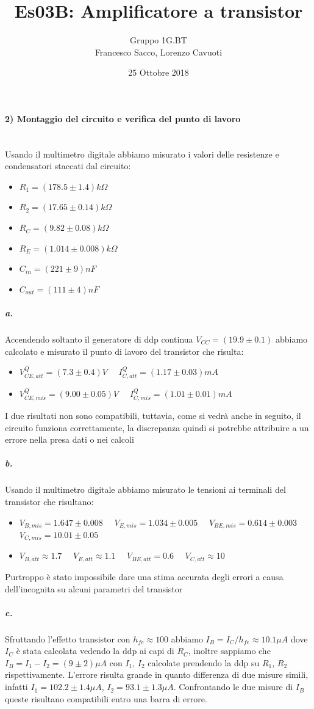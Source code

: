 \documentclass[10pt,a4paper]{article}
\author{Gruppo 1G.BT \\ Francesco Sacco, Lorenzo Cavuoti}
\title{Es03B: Amplificatore a transistor}
\date{25 Ottobre 2018}
\begin{document}
\maketitle
\paragraph{2) Montaggio del circuito e verifica del punto di lavoro}\mbox{}\\
Usando il multimetro digitale abbiamo misurato i valori delle resistenze e condensatori staccati dal circuito:
\begin{itemize}
\item[] $R_1=(178.5\pm1.4)k\Omega$ 
\item[] $R_2=(17.65\pm0.14)k\Omega$ 
\item[] $R_C=(9.82\pm0.08)k\Omega$ 
\item[] $R_E=(1.014\pm0.008)k\Omega$
\item[] $C_{in}=(221\pm9)nF$
\item[] $C_{out}=(111\pm4)nF$
\end{itemize}

\subparagraph{a.}
Accendendo soltanto il generatore di ddp continua $V_{CC}=(19.9\pm0.1)$ abbiamo calcolato e misurato il punto di lavoro del transistor che risulta:
\begin{itemize}
\item[] $V_{CE,att}^Q = (7.3\pm0.4)V \quad$ $I_{C,att}^Q = (1.17\pm0.03)mA \quad$
\item[] $V_{CE,mis}^Q = (9.00\pm0.05)V \quad$ $ I_{C,mis}^Q = (1.01\pm0.01)mA \quad$
\end{itemize}
I due risultati non sono compatibili, tuttavia, come si vedrà anche in seguito, il circuito funziona correttamente, la discrepanza quindi si potrebbe attribuire a un errore nella presa dati o nei calcoli

\subparagraph{b.}
Usando il multimetro digitale abbiamo misurato le tensioni ai terminali del transistor che risultano:
\begin{itemize}
\item[] $V_{B,mis} = 1.647\pm0.008 \quad$ $V_{E,mis} = 1.034\pm 0.005 \quad$ $V_{BE,mis} = 0.614\pm0.003 \quad$ $V_{C,mis} = 10.01\pm0.05$
\item[] $V_{B,att} \approx 1.7 \quad$ $V_{E,att} \approx 1.1 \quad$ $V_{BE,att} = 0.6 \quad$ $V_{C,att} \approx 10$\newline
\end{itemize}
Purtroppo è stato impossibile dare una stima accurata degli errori a causa dell'incognita su alcuni parametri del transistor
\subparagraph{c.}
Sfruttando l'effetto transistor con $h_{fe}\approx 100$ abbiamo $I_B = I_C/h_{fe} \approx 10.1 \mu A$ dove $I_C$ è stata calcolata vedendo la ddp ai capi di $R_C$, inoltre sappiamo che $I_B = I_1-I_2 = (9\pm2)\mu A$ con $I_1$, $I_2$ calcolate prendendo la ddp su $R_1$, $R_2$ rispettivamente. L'errore risulta grande in quanto differenza di due misure simili, infatti $I_1=102.2\pm1.4\mu A$, $I_2=93.1\pm1.3\mu A$. Confrontando le due misure di $I_B$ queste risultano compatibili entro una barra di errore.
	
\end{document}
